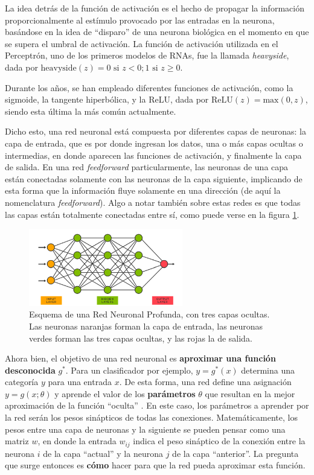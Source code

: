 \documentclass[../../main.tex]{subfiles}
\begin{document}
La idea detrás de la función de activación es el hecho de propagar la información proporcionalmente al estímulo provocado por las entradas en la neurona, basándose en la idea de ``disparo'' de una neurona biológica en el momento en que se supera el umbral de activación. La función de activación utilizada en el Perceptrón, uno de los primeros modelos de RNAs, fue la llamada \textit{heavyside}, dada por \(\text{heavyside}(z)=0\text{ si }z < 0; 1\text{ si } z\geq0\). 

Durante los años, se han empleado diferentes funciones de activación, como la sigmoide, la tangente hiperbólica, y la ReLU, dada por \(\text{ReLU}(z)=\text{max}(0, z)\), siendo esta última la más común actualmente.

Dicho esto, una red neuronal está compuesta por diferentes capas de neuronas: la capa de entrada, que es por donde ingresan los datos, una o más capas ocultas o intermedias, en donde aparecen las funciones de activación, y finalmente la capa de salida. En una red \textit{feedforward} particularmente, las neuronas de una capa están conectadas solamente con las neuronas de la capa siguiente, implicando de esta forma que la información fluye solamente en una dirección (de aquí la nomenclatura \textit{feedforward}). Algo a notar también sobre estas redes es que todas las capas están totalmente conectadas entre sí, como puede verse en la figura \ref{fig:neural-net}.

\begin{figure}[h!]
    \centering
    \includegraphics[width=0.6\textwidth]{figs/feedforward.png}
    \caption{Esquema de una Red Neuronal Profunda, con tres capas ocultas. Las neuronas naranjas forman la capa de entrada, las neuronas verdes forman las tres capas ocultas, y las rojas la de salida.}
    \label{fig:neural-net}
\end{figure}

Ahora bien, el objetivo de una red neuronal es \textbf{aproximar una función desconocida} \(g^*\). Para un clasificador por ejemplo, \(y=g^*(x)\) determina una categoría \(y\) para una entrada \(x\). De esta forma, una red define una asignación \(y=g(x; \theta)\) y aprende el valor de los \textbf{parámetros} \(\theta\) que resultan en la mejor aproximación de la función ``oculta'' \cite{deep-learning}. En este caso, los parámetros a aprender por la red serán los pesos sinápticos de todas las conexiones. Matemáticamente, los pesos entre una capa de neuronas y la siguiente se pueden pensar como una matriz \(w\), en donde la entrada \(w_{ij}\) indica el peso sináptico de la conexión entre la neurona \(i\) de la capa ``actual'' y la neurona \(j\) de la capa ``anterior''. La pregunta que surge entonces es \textbf{cómo} hacer para que la red pueda aproximar esta función.
\end{document}
